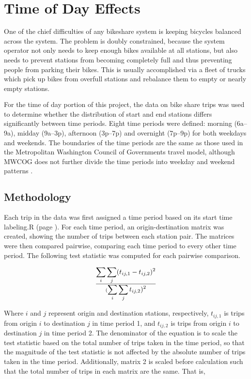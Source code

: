 \documentclass[letterpaper,11pt]{article}
\newcommand{\reflst}[1]{#1 (page \pageref{#1})}
\begin{document}
\section{Time of Day Effects}

One of the chief difficulties of any bikeshare system is keeping
bicycles balanced across the system. The problem is doubly
constrained, because the system operator not only needs to keep enough
bikes available at all stations, but also needs to prevent stations
from becoming completely full and thus preventing people from parking
their bikes. This is usually accomplished via a fleet of trucks which
pick up bikes from overfull stations and rebalance them to empty or
nearly empty stations.

For the time of day portion of this project, the data on bike share
trips was used to determine whether the distribution of start and end
stations differs significantly between time periods. Eight time
periods were defined: morning (6a--9a), midday (9a--3p), afternoon
(3p--7p) and overnight (7p--9p) for both weekdays and weekends. The
boundaries of the time periods are the same as those used in the
Metropolitan Washington Council of Governments travel model, although
MWCOG does not further divide the time periods into weekday and
weekend patterns \autocite[14]{MWCOG2013}.

\subsection{Methodology}

Each trip in the data was first assigned a time period based on its
start time \reflst{labeling.R}. For each time period, an origin-destination matrix was
created, showing the number of trips between each station pair. The
matrices were then compared pairwise, comparing each time period to
every other time period. The following test statistic was computed for
each pairwise comparison.

\begin{equation}\label{eq:timets}
 \displaystyle\sum_i \sum_j (t_{ij,1} - t_{ij,2})^2 \over
 (\displaystyle \sum_i \sum_j t_{ij,2})^2
\end{equation}

Where $i$ and $j$ represent origin and destination stations,
respectively, $t_{ij,1}$ is trips from origin $i$ to destination $j$
in time period 1, and $t_{ij,2}$ is trips from origin $i$ to
destination $j$ in time period 2. The denominator of the equation is
to scale the test statistic based on the total number of trips taken
in the time period, so that the magnitude of the test statistic is not
affected by the absolute number of trips taken in the time
period. Additionally, matrix 2 is scaled before calculation such
that the total number of trips in each matrix are the same. That is,
\end{document}

